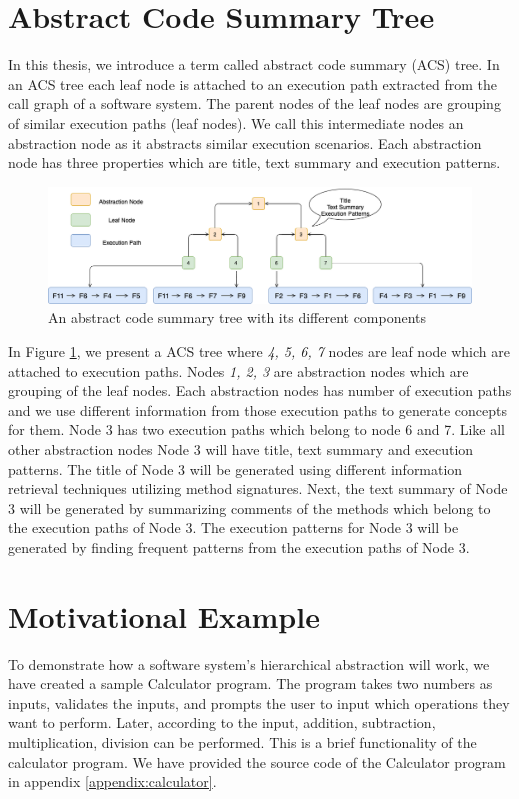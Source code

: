 \section{Abstract Code Summary Tree}
\label{background:cct}
In this thesis, we introduce a term called abstract code summary (ACS) tree. In an ACS tree each leaf node is attached to an execution path extracted from the call graph of a software system. The parent nodes of the leaf nodes are grouping of similar execution paths (leaf nodes). We call this intermediate nodes an abstraction node as it abstracts similar execution scenarios. Each abstraction node has three properties which are title, text summary and execution patterns. 

\begin{figure}[h]
  \centering
  \includegraphics[width=\columnwidth]{figures/background/cct.png}
  \caption{An abstract code summary tree with its different components }
  \label{background:cct}
\end{figure}
In Figure \ref{background:cct}, we present a ACS tree where \emph{4, 5, 6, 7} nodes are leaf node which are attached to execution paths. Nodes \emph{1, 2, 3} are abstraction nodes which are grouping of the leaf nodes. Each abstraction nodes has number of execution paths and we use different information from those execution paths to generate concepts for them. Node 3 has two execution paths which belong to node 6 and 7. Like all other abstraction nodes Node 3 will have title, text summary and execution patterns. The title of Node 3 will be generated using different information retrieval techniques utilizing method signatures. Next, the text summary of Node 3 will be generated by summarizing comments of the methods which belong to the execution paths of Node 3. The execution patterns for Node 3 will be generated by finding frequent patterns from the execution paths of Node 3.

\section{Motivational Example}
\label{background:motive}
To demonstrate how a software system's hierarchical abstraction will work, we have created a sample Calculator program. The program takes two numbers as inputs, validates the inputs, and prompts the user to input which operations they want to perform. Later, according to the input, addition, subtraction, multiplication, division can be performed. This is a brief functionality of the calculator program. We have provided the source code of the Calculator program in appendix \ref{appendix:calculator}.

